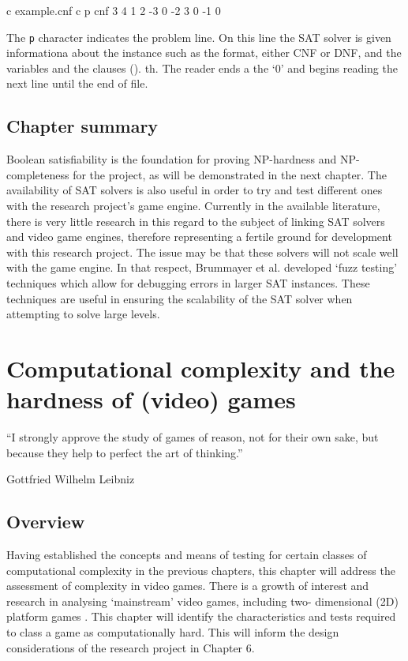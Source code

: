 \documentclass[11pt, a4paper, oneside]{report} %
\begin{document}
c example.cnf
c
p cnf 3 4
 1  2 -3 0
-2  3    0
-1       0


The \texttt{p} character indicates the problem line. On this line the SAT solver
is given informationa about the instance such as the format, either CNF or DNF,
and the variables  {} and the clauses (). th. The reader ends a the `0' and
begins reading the next line until the end of file.


\section{Chapter summary}

Boolean satisfiability is the foundation for proving NP-hardness and NP-
completeness for the project, as will be demonstrated in the next chapter. The
availability of SAT solvers is also useful in order to try and test different
ones with the research project's game engine. Currently in the available
literature, there is very little research in this regard to the subject of
linking SAT solvers and video game engines, therefore representing a fertile
ground for development with this research project. The issue may be that these
solvers will not scale well with the game engine. In that respect, Brummayer et
al. \cite{brummayer2010automated} developed `fuzz testing' techniques which
allow for debugging errors in larger SAT instances. These techniques are useful
in ensuring the scalability of the SAT solver when attempting to solve large
levels.





\chapter{Computational complexity and the hardness of (video) games}

\epigraph{``I strongly approve the study of games of reason, not for their own
sake, but because they help to perfect the art of thinking.''}{Gottfried
Wilhelm Leibniz}

\section{Overview}

Having established the concepts and means of testing for certain classes of
computational complexity in the previous chapters, this chapter will address the
assessment of complexity in video games. There is a growth of interest and
research in analysing `mainstream' video games, including two- dimensional (2D)
platform games  \cite{viglietta2014gaming, DBLP:conf/fun/Forisek10, Aloupis2012,
Smith:2008:FAP:1401843.1401858}. This chapter will identify the characteristics
and tests required to class a game as computationally hard. This will inform the
design considerations of the research project in Chapter 6.
\end{document}
